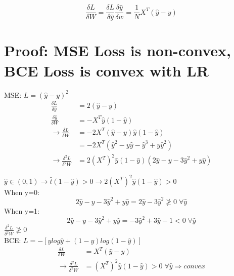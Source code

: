 \documentclass[12pt,letterpaper]{article}
\begin{document}
    \begin{equation*}
        \frac{\delta L}{\delta W} = \frac{\delta L}{\delta \hat{y}} \frac{\delta \hat{y}}{\delta w}
                                  = \frac{1}{N} X^T (\hat{y}-y)
    \end{equation*}


\pagebreak                  
\section{Proof: MSE Loss is non-convex, BCE Loss is convex with LR}
    MSE: $L = (\hat{y} - y)^2$
    \begin{align*}
        \frac{\delta L}{\delta \hat{y}} &= 2(\hat{y}-y)\\
        \frac{\delta \hat{y}}{\delta W} &= -X^{T} \hat{y}(1 - \hat{y})\\
        \rightarrow
        \frac{\delta L}{\delta W} &= -2X^T(\hat{y}-y)\hat{y}(1 - \hat{y})\\
                                  &= -2X^T(\hat{y}^2-y\hat{y}-\hat{y}^3+y\hat{y}^2)\\
        \rightarrow
        \frac{\delta^2L}{\delta^2W} &= 2(X^T)^2\hat{y}(1-\hat{y})(2\hat{y}-y-3\hat{y}^2+y\hat{y})
    \end{align*}
    
    \(\hat{y} \in (0, 1) \rightarrow \hat{t}(1-\hat{y})>0 \rightarrow 2(X^T)^2\hat{y}(1-\hat{y})>0\)\\
    When y=0: 
    \begin{equation*}
        2\hat{y}-y-3\hat{y}^2+y\hat{y} = 2\hat{y} - 3\hat{y}^2 \ngeq 0 \; \forall \hat{y}
    \end{equation*}
    When y=1: 
    \begin{equation*}
        2\hat{y}-y-3\hat{y}^2+y\hat{y} = -3\hat{y}^2 +3\hat{y} -1 < 0 \; \forall \hat{y}
    \end{equation*}
    \Rightarrow \(\frac{\delta^2L}{\delta^2W} \ngeq 0\) \forall {} \Rightarrow {}\\

    BCE: \(L = -[ylog\hat{y} + (1-y)log(1- \hat{y})]\)
    \begin{align*}
        \frac{\delta L}{\delta W} &=  X^T (\hat{y}-y)\\
        \rightarrow
        \frac{\delta^2L}{\delta^2W} &= (X^T)^2\hat{y}(1-\hat{y}) > 0 \; \forall \hat{y} \Rightarrow convex
    \end{align*}
    
\end{document}
